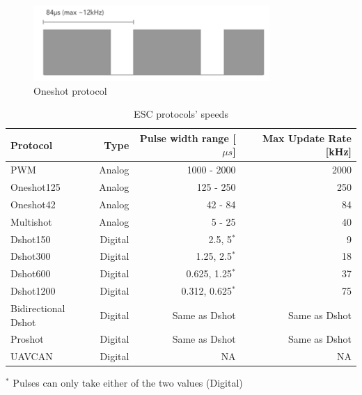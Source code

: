 \begin{figure}
    \centering
    \includegraphics[width=0.8\textwidth]{images/oneshot_sketch.png}
    \caption{Oneshot protocol \cite{BackyardRobotics2018}}
    \label{fig:oneshot}
\end{figure}

\begin{table}
\begin{center}
 \caption{ESC protocols' speeds}\vspace{1ex}
 \label{tab:tab_esc_prot}
 \begin{tabular}{l|rrr}
 \hline
Protocol & Type & Pulse width range [$\mu s$]  & Max Update Rate [kHz] \\ \hline \hline
PWM                 & Analog & 1000 - 2000      & 2000\\
Oneshot125          & Analog & 125 - 250        & 250\\
Oneshot42           & Analog & 42 - 84          & 84\\
Multishot           & Analog & 5 - 25           & 40\\
Dshot150            & Digital & 2.5, 5$^*$          & 9\\
Dshot300            & Digital & 1.25, 2.5$^*$       & 18\\
Dshot600            & Digital & 0.625, 1.25$^*$     & 37\\
Dshot1200           & Digital & 0.312, 0.625$^*$    & 75\\
Bidirectional Dshot & Digital & Same as Dshot   & Same as Dshot \\
Proshot             & Digital & Same as Dshot   & Same as Dshot\\
UAVCAN              & Digital & NA              & NA\\
 \end{tabular}
\end{center}
\footnotesize{$^*$ Pulses can only take either of the two values (Digital)}
\end{table}



